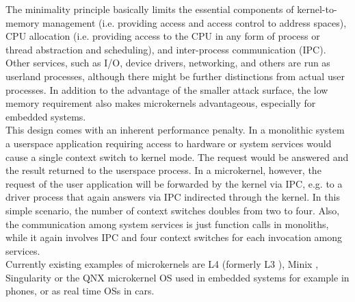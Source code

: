 The minimality principle basically limits the essential components of kernel-to-memory management (i.e. providing access and access control to address spaces), CPU allocation (i.e. providing access to the CPU in any form of process or thread abstraction and scheduling), and inter-process communication (IPC). Other services, such as I/O, device drivers, networking, and others are run as userland processes, although there might be further distinctions from actual user processes. In addition to the advantage of the smaller attack surface, the low memory requirement also makes microkernels advantageous, especially for embedded systems. \\

This design comes with an inherent performance penalty. In a monolithic system a userspace application requiring access to hardware or system services would cause a single context switch to kernel mode. The request would be answered and the result returned to the userspace process. In a microkernel, however, the request of the user application will be forwarded by the kernel via IPC, e.g. to a driver process that again answers via IPC indirected through the kernel. In this simple scenario, the number of context switches doubles from two to four. Also, the communication among system services is just function calls in monoliths, while it again involves IPC and four context switches for each invocation among services. \\

Currently existing examples of microkernels are L4 (formerly L3 \cite{liedtke1993persistent}), Minix \cite{herder2006minix}, Singularity \cite{hunt2005overview} or the QNX microkernel OS\cite{hildebrand1992architectural} used in embedded systems for example in phones, or as real time OSs in cars.

